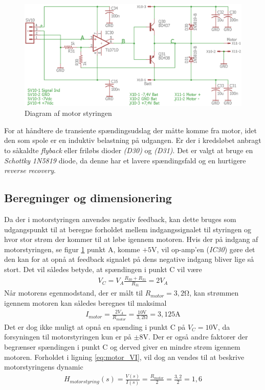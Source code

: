 \begin{figure}[h!]
	\centering
	\includegraphics[width=1\textwidth]{billeder/motor_cont_schematic.png}
	\caption{Diagram af motor styringen}
	\label{fig:motor_diagram}
\end{figure}
\FloatBlock

For at håndtere de transiente spændingsudslag der måtte komme fra motor, idet den som spole er en induktiv belastning på udgangen.
Er der i kredsløbet anbragt to såkaldte \textit{flyback} eller friløbs dioder \emph{(D30)} og \emph{(D31)}.
Det er valgt at bruge en \textit{Schottky} \emph{1N5819}\cite{1N5819} diode, da denne har et lavere spændingsfald og en hurtigere \textit{reverse recovery}.

\subsection{Beregninger og dimensionering}
Da der i motorstyringen anvendes negativ feedback, kan dette bruges som udgangspunkt til at beregne forholdet mellem indgangssignalet til styringen og hvor stor strøm der kommer til at løbe igennem motoren.
Hvis der på indgang af motorstyringen, se figur \ref{fig:motor_diagram} punkt A, komme $+5 \si{\volt}$, vil op-amp'en (\emph{IC30}) gøre det den kan for at opnå at feedback signalet på dens negative indgang bliver lige så stort.
Det vil således betyde, at spændingen i punkt C vil være
\begin{align}
V_C = V_A \frac{R_{30}+R_{31}}{R_{31}} = 2V_A
\end{align}
Når motorens egenmodstand, der er målt til $R_{motor} = 3,2 \si{\ohm}$, kan strømmen igennem motoren kan således beregnes til maksimal
\begin{align}
I_{motor} =  \frac{2V_A}{R_{motor}} = \frac{10\si{\volt}}{3,2\si{\ohm}} = 3,125\si{\ampere} \label{eq:motor_VI}
\end{align}
Det er dog ikke muligt at opnå en spænding i punkt C på $V_C = 10\si{\volt}$, da forsyningen til motorstyringen kun er på $\pm 8 \si{\volt}$.
Der er også andre faktorer der begrænser spændingen i punkt C og derved giver en mindre strøm igennem motoren.
Forholdet i ligning \ref{eq:motor_VI}, vil dog an vendes til at beskrive motorstyringens dynamic
\begin{align}
H_{motor styring}(s) = \frac{V(s)}{I(s)} =\frac{R_{motor}}{2} = \frac{3,2}{2} = 1,6 \label{eq:motor_styr_trans}
\end{align}   


